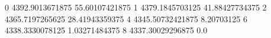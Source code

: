 0 4392.9013671875 55.60107421875
1 4379.1845703125 41.88427734375
2 4365.7197265625 28.41943359375
4 4345.50732421875 8.20703125
6 4338.3330078125 1.03271484375
8 4337.30029296875 0.0
